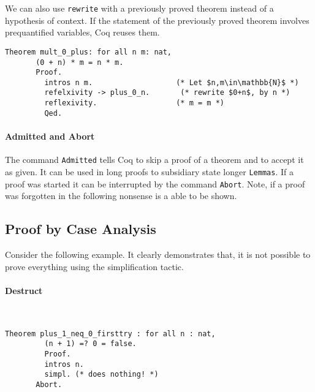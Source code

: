 	   We can also use \lstinline!rewrite! with a previously proved theorem instead of a hypothesis of context.
	   If the statement of the previously proved theorem involves prequantified variables, Coq reuses them.   
	   \begin{lstlisting}[caption=\lstinline!mult_0_plus!]
	   Theorem mult_0_plus: for all n m: nat,
	   (0 + n) * m = n * m.
	   Proof.
	     intros n m.                   (* Let $n,m\in\mathbb{N}$ *) 
	     refelxivity -> plus_0_n.       (* rewrite $0+n$, by n *)
	     reflexivity.                  (* m = m *)
	     Qed.
	   \end{lstlisting}   
	
		\paragraph{Admitted and Abort}
		
		The command \lstinline!Admitted! tells Coq to skip a proof of a theorem and to accept it as given.
		It can be used in long proofs to subsidiary state longer \lstinline!Lemmas!.
		If a proof was started it can be interrupted by the command \lstinline!Abort!.
		Note, if a proof was forgotten in the following nonsense is a able to be shown. \\
		
	\subsection{Proof by Case Analysis}
	   Consider the following example. It clearly demonstrates that, it is not possible to prove everything using the simplification tactic.   
	   
	   
	   \paragraph{Destruct}	~\vspace{-5mm}
	   \begin{lstlisting}[caption= \lstinline! plus_1_neq_0_firsttry!]
	   Theorem plus_1_neq_0_firsttry : for all n : nat,
	     (n + 1) =? 0 = false.
	     Proof.
	     intros n.
	     simpl. (* does nothing! *)
	   Abort.
	   \end{lstlisting}
	   
